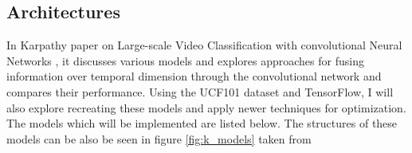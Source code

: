 

\subsection{Architectures}

In Karpathy paper on Large-scale Video Classification with convolutional Neural Networks \citep{KarpathyCVPR14}, it discusses various models and explores approaches for fusing information over temporal dimension through the convolutional network and compares their performance. Using the UCF101 dataset and TensorFlow, I will also explore recreating these models and apply newer techniques for optimization. The models which will be implemented are listed below. The structures of these models can be also be seen in figure \ref{fig:k_models} taken from \citep{KarpathyCVPR14}
